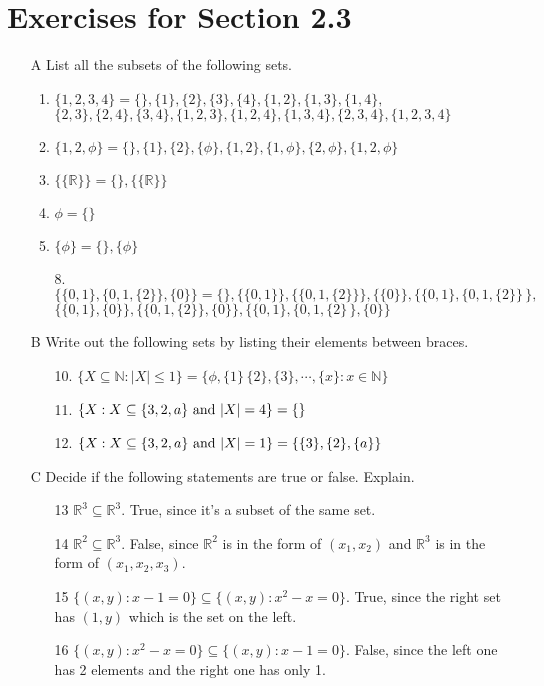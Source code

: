 \documentclass[12pt]{article}
\begin{document}
\section*{Exercises for Section 2.3}
    \begin{itemize}
	\item [A] List all the subsets of the following sets.
	    \begin{enumerate}
		\item $\{1,2,3,4\} = \{\}, \{1\}, \{2\}, \{3\}, \{4\}, \{1,2\},\{1,3\},\{1,4\},$\\
		    $\{2,3\}, \{2,4\}, \{3,4\}, \{1,2,3\}, \{1,2,4\}, \{1,3,4\}, \{2,3,4\}, \{1,2,3,4\} $
		\item $\{1,2,\phi\} = \{\}, \{1\}, \{2\}, \{\phi\}, \{1,2\}, \{1,\phi\}, \{2,\phi\}, \{1,2,\phi\}$
		\item $\{\{\mathbb{R}\}\} = \{\}, \{\{\mathbb{R}\}\}$
		\item $\phi = \{\}$
	    \item $\{\phi\} = \{\}, \{\phi\}$
		\item [8.] $\{\{0,1\}, \{0,1,\{2\}\}, \{0\}\} = \{\}, \{\{0,1\}\}, \{\{0,1,\{2\}\}\}, \{\{0\}\}, \{\{0,1\}, \{0,1,\{2\}\}\,\},$\\
		    $\{\{0,1\}, \{0\}\}, \{\{0,1,\{2\}\}, \{0\}\}, \{\{0,1\}, \{0,1,\{2\}\,\}, \{0\}\}$
	    \end{enumerate}
	\item [B] Write out the following sets by listing their elements between braces.
	    \begin{itemize}
	    \item [10.] $\{ X\subseteq \mathbb{N} : |X| \le 1\} = \{\phi,\{1\}\, \{2\}, \{3\}, \cdots, \{x\}:x\in\mathbb{N}\}$
		\item [11.] $\{X: X\subseteq \{3,2, a\} \ \textnormal{and} \  |X| = 4\} = \{\}$
		\item [12.] $\{X: X\subseteq \{3,2, a\} \ \textnormal{and} \  |X| = 1\} = \{\{3\}, \{2\}, \{a\}\}$
	    \end{itemize}
	\item [C] Decide if the following statements are true or false. Explain.
	    \begin{itemize}
		\item [13] $\mathbb{R}^3 \subseteq \mathbb{R}^3$. True, since it's a subset of the same set.
		\item [14] $\mathbb{R}^2 \subseteq \mathbb{R}^3$. False, since $\mathbb{R}^2$ is in the form of $(x_1,x_2)$ and $\mathbb{R}^3$ is in the form of $(x_1,x_2,x_3)$.
		\item [15] $\{(x,y):x-1=0\} \subseteq \{(x,y):x^2-x=0\}$. True, since the right set has $(1,y)$ which is the set on the left.
		\item [16] $\{(x,y):x^2-x=0\}\subseteq\{(x,y):x-1=0\}$. False, since the left one has 2 elements and the right one has only 1.
	    \end{itemize}
    \end{itemize}
\end{document}
